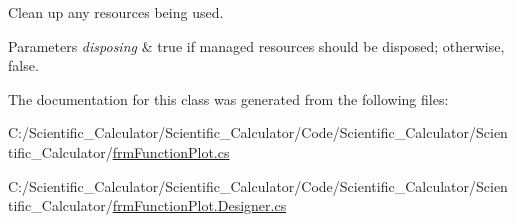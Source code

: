 Clean up any resources being used. 


\begin{DoxyParams}{Parameters}
{\em disposing} & true if managed resources should be disposed; otherwise, false.\\
\hline
\end{DoxyParams}


The documentation for this class was generated from the following files\+:\begin{DoxyCompactItemize}
\item 
C\+:/\+Scientific\+\_\+\+Calculator/\+Scientific\+\_\+\+Calculator/\+Code/\+Scientific\+\_\+\+Calculator/\+Scientific\+\_\+\+Calculator/\hyperlink{frm_function_plot_8cs}{frm\+Function\+Plot.\+cs}\item 
C\+:/\+Scientific\+\_\+\+Calculator/\+Scientific\+\_\+\+Calculator/\+Code/\+Scientific\+\_\+\+Calculator/\+Scientific\+\_\+\+Calculator/\hyperlink{frm_function_plot_8_designer_8cs}{frm\+Function\+Plot.\+Designer.\+cs}\end{DoxyCompactItemize}

